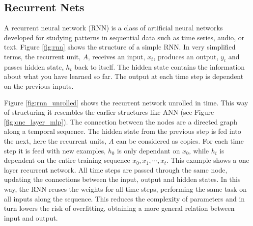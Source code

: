 \subsection{Recurrent Nets} \label{sec:reccurent_nets}

A recurrent neural network (RNN) is a class of artificial neural networks developed for studying patterns in sequential data such as time series, audio, or text. Figure \ref{fig:rnn} shows the structure of a simple RNN. In very simplified terms, the recurrent unit, $A$, receives an input, $x_t$, produces an output, $y_t$ and passes hidden state, $h_t$ back to itself. The hidden state contains the information about what you have learned so far. The output at each time step is dependent on the previous inputs. 


Figure \ref{fig:rnn_unrolled} shows the recurrent network unrolled in time. This way of structuring it resembles the earlier structures like ANN (see Figure \ref{fig:one_layer_mlp}). The connection between the nodes %
are a directed graph along a temporal sequence. The hidden state from the previous step is fed into the next, here the recurrent units, $A$ can be considered as copies. For each time step it is feed with new examples, $h_0$ is only dependant on $x_0$, while $h_t$ is dependent on the entire training sequence $x_0, x_1, \cdots, x_t $. This example shows a one layer recurrent network. All time steps are passed through the same node, updating the connections between the input, output and hidden states. In this way, the RNN reuses the weights for all time steps, performing the same task on all inputs along the sequence. This reduces the complexity of parameters and in turn lowers the risk of overfitting, obtaining a more general relation between input and output.

